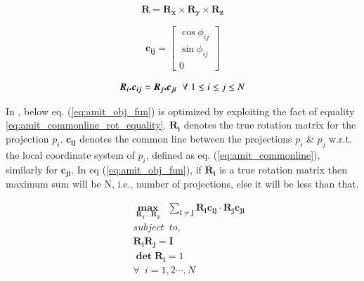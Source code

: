 \documentclass[twoside]{iitbreport}
\begin{document}
 
 \begin{equation} \label{eq:rotation_xyz}
     \boldsymbol{R}  =   \boldsymbol{R_x} \times \boldsymbol{R_y} \times \boldsymbol{R_z}
 \end{equation}
 
  \begin{equation} \label{eq:amit_commonline}
     \boldsymbol{c_{ij}}  
      =  
     \begin{bmatrix}
       \cos{\phi_{ij}} \\ 
       \sin{\phi_{ij}} \\ 
       0  
     \end{bmatrix}
 \end{equation}
 
 \begin{equation} \label{eq:amit_commonline_rot_equality}
     \boldsymbol{R_i.c_{ij}}  =   \boldsymbol{R_j.c_{ji}} \hspace{0.2cm} \forall \hspace{0.1 cm}  1\lneq i \lneq j \lneq N
 \end{equation}
 
 In \cite{sigworthcryoAngleEstimate}, below eq. (\ref{eq:amit_obj_fun}) is optimized by exploiting the fact of equality \ref{eq:amit_commonline_rot_equality}. ${\boldsymbol{R_i}}$ denotes the true rotation matrix for the projection ${p_i}$. ${\boldsymbol{c_{ij}}}$ denotes the common line between the projections ${p_i}$ \& ${p_j}$ w.r.t.  the local coordinate system of ${p_i}$, defined as eq. (\ref{eq:amit_commonline}), similarly for ${\boldsymbol{c_{ji}}}$. In eq (\ref{eq:amit_obj_fun}), if ${\boldsymbol{R_i}}$ is a true rotation matrix then maximum sum will be N, i.e., number of projections, else it will be less than that. 
 
 
 \begin{equation}\label{eq:amit_obj_fun}
  \begin{aligned}
  & \enspace \boldsymbol{\max\limits_{R_1\dots R_2}} \enspace \boldsymbol{\sum\limits_{i \neq j}} \boldsymbol{R_ic_{ij}} 	\cdot \boldsymbol{R_jc_{ji}}  \\
     &  \enspace  subject \enspace to,\\
     & \enspace  \boldsymbol{R_i}\boldsymbol{R_j} =  \boldsymbol{I} \\
     & \enspace \boldsymbol{\det{R_i}}= 1 \\
     &  \enspace  \forall \enspace i = 1,2 \cdots , N\\
  \end{aligned}
\end{equation}
\end{document}
